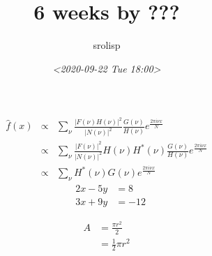 \documentclass[11pt]{article}
\author{srolisp}
\date{\textit{<2020-09-22 Tue 18:00>}}
\title{\\\medskip
\large 6 weeks by ???}
\begin{document}
\tableofcontents

\begin{eqnarray*}
\hat{f}(x) & \propto & \sum_{\nu} \frac{|F(\nu)H(\nu)|^2}{|N(\nu)|^2}  
           \frac{G(\nu)}{H(\nu)} e^{\frac{2 \pi i \nu x}{N}}\\
           & \propto & \sum_{\nu} \frac{|F(\nu)|^2}{|N(\nu)|^2} H(\nu) H^*(\nu) 
           \frac{G(\nu)}{H(\nu)} e^{\frac{2 \pi i \nu x}{N}}\\
           & \propto & \sum_{\nu} H^*(\nu) G(\nu) e^{\frac{2 \pi i \nu x}{N}}
\end{eqnarray*}
\begin{align*} 
&2x - 5y &=  8 \\ 
&3x + 9y &=  -12
\end{align*}

\begin{equation} \label{eq1}
\begin{split}
A & = \frac{\pi r^2}{2} \\
 & = \frac{1}{2} \pi r^2
\end{split}
\end{equation}
\end{document}

